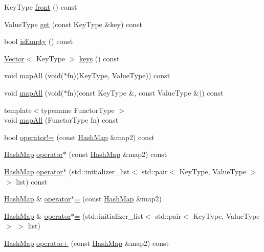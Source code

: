 \begin{DoxyCompactItemize}
Key\+Type \mbox{\hyperlink{classHashMap_a6e76878901fa73e176909ac015834f1a}{front}} () const
\item 
Value\+Type \mbox{\hyperlink{classHashMap_a3ac97b0a9a7fa131221427f628667ae9}{get}} (const Key\+Type \&key) const
\item 
bool \mbox{\hyperlink{classHashMap_acf82f9b2937375c7b1cf3dccb3df3312}{is\+Empty}} () const
\item 
\mbox{\hyperlink{classVector}{Vector}}$<$ Key\+Type $>$ \mbox{\hyperlink{classHashMap_a88e3a058d30d97a5ce6ae57608e7db17}{keys}} () const
\item 
void \mbox{\hyperlink{classHashMap_a19f96e0d9ac469495dd46924139d697e}{map\+All}} (void($\ast$fn)(Key\+Type, Value\+Type)) const
\item 
void \mbox{\hyperlink{classHashMap_a02c631ce6ad1bdf96e585f7041ab5556}{map\+All}} (void($\ast$fn)(const Key\+Type \&, const Value\+Type \&)) const
\item 
{\footnotesize template$<$typename Functor\+Type $>$ }\\void \mbox{\hyperlink{classHashMap_a8dc32c1e45704cfae41daf8adb4e66dc}{map\+All}} (Functor\+Type fn) const
\item 
bool \mbox{\hyperlink{classHashMap_a15020f848c96395390a02e18473d61d3}{operator!=}} (const \mbox{\hyperlink{classHashMap}{Hash\+Map}} \&map2) const
\item 
\mbox{\hyperlink{classHashMap}{Hash\+Map}} \mbox{\hyperlink{classHashMap_a8336e7e5cf4882484f71f7b9d21874c3}{operator$\ast$}} (const \mbox{\hyperlink{classHashMap}{Hash\+Map}} \&map2) const
\item 
\mbox{\hyperlink{classHashMap}{Hash\+Map}} \mbox{\hyperlink{classHashMap_a0e61592f3070b536da8241211447da77}{operator$\ast$}} (std\+::initializer\+\_\+list$<$ std\+::pair$<$ Key\+Type, Value\+Type $>$ $>$ list) const
\item 
\mbox{\hyperlink{classHashMap}{Hash\+Map}} \& \mbox{\hyperlink{classHashMap_aeeef62e8c38083e34f8a611816f9d767}{operator$\ast$=}} (const \mbox{\hyperlink{classHashMap}{Hash\+Map}} \&map2)
\item 
\mbox{\hyperlink{classHashMap}{Hash\+Map}} \& \mbox{\hyperlink{classHashMap_aeaca3b68c3c20b603a11827f8968aed7}{operator$\ast$=}} (std\+::initializer\+\_\+list$<$ std\+::pair$<$ Key\+Type, Value\+Type $>$ $>$ list)
\item 
\mbox{\hyperlink{classHashMap}{Hash\+Map}} \mbox{\hyperlink{classHashMap_afba7f384a875018877c06fa71f6e7b5e}{operator+}} (const \mbox{\hyperlink{classHashMap}{Hash\+Map}} \&map2) const

\end{DoxyCompactItemize}
